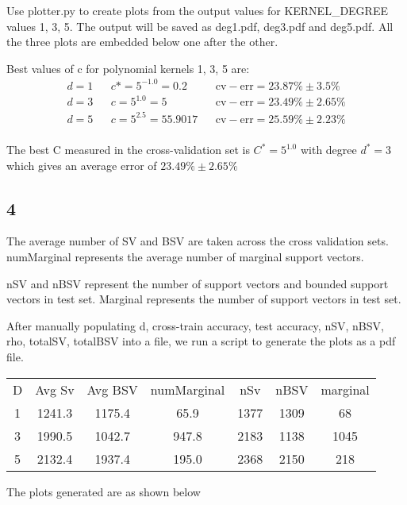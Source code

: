\documentclass{article}
\begin{document}
Use plotter.py\cite{plotterpy} to create plots from the output values for KERNEL\_DEGREE values 1, 3, 5.  The output will be saved as deg1.pdf, deg3.pdf and deg5.pdf.  All the three plots are embedded below one after the other.




Best values of c for polynomial kernels 1, 3, 5 are:
\begin{align*}
  d = 1 && c* = 5^{-1.0} = 0.2 && \mathrm{cv-err} = 23.87\% \pm 3.5\% \\
  d = 3 && c = 5^{1.0} = 5 && \mathrm{cv-err} = 23.49\% \pm 2.65\%\\
  d = 5 && c = 5^{2.5} = 55.9017 && \mathrm{cv-err} = 25.59\% \pm 2.23\% \\
\end{align*}

The best C measured in the cross-validation set is \( C^{*} = 5^{1.0} \) with degree \( d^{*} = 3 \) which gives an average error of \( 23.49\% \pm 2.65\% \)

\subsection*{4}
The average number of SV and BSV are taken across the cross validation sets. numMarginal represents the average number of marginal support vectors.

nSV and nBSV represent the number of support vectors and bounded support vectors in test set.  Marginal represents the number of support vectors in test set.

After manually populating d, cross-train accuracy, test accuracy, nSV, nBSV, rho, totalSV, totalBSV into a file\cite{ques4file}, we run a script\cite{ques4py} to generate the plots as a pdf file.

\begin{tabular}{*{7}{c}}
  D & Avg Sv & Avg BSV & numMarginal & nSv & nBSV & marginal \\
  1 & 1241.3 & 1175.4 & 65.9 & 1377 & 1309 & 68 \\
  3 & 1990.5 & 1042.7 & 947.8 & 2183 & 1138 & 1045 \\
  5 & 2132.4 & 1937.4 & 195.0 & 2368 & 2150 & 218 \\
\end{tabular}

The plots generated are as shown below
\end{document}

